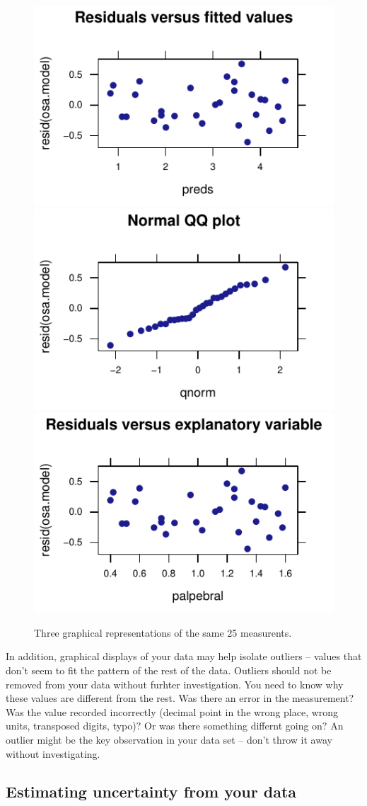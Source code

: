 \documentclass[twoside]{book}\usepackage[]{graphicx}\usepackage[]{xcolor}
\newenvironment{knitrout}{}{} %
\begin{document}
\begin{figure}[h]
\begin{knitrout}
\color{fgcolor}

{\centering \includegraphics[width=.3\textwidth]{figures/fig-unnamed-chunk-172-1} 
\includegraphics[width=.3\textwidth]{figures/fig-unnamed-chunk-172-2} 
\includegraphics[width=.3\textwidth]{figures/fig-unnamed-chunk-172-3} 

}



\end{knitrout}
\caption{Three graphical representations of the same 25 measurents.}
\end{figure}


In addition, graphical displays of your data may help isolate outliers -- values
that don't seem to fit the pattern of the rest of the data.  Outliers should not be removed
from your data without furhter investigation.  You need to know why these values are 
different from the rest.  Was there an error in the measurement?  Was the value recorded
incorrectly (decimal point in the wrong place, wrong units, transposed digits, typo)?
Or was there something differnt going on?  An outlier might be the key observation in 
your data set -- don't throw it away without investigating.

\subsection{Estimating uncertainty from your data}
\label{sec:uncertainty-from-data}
\end{document}
